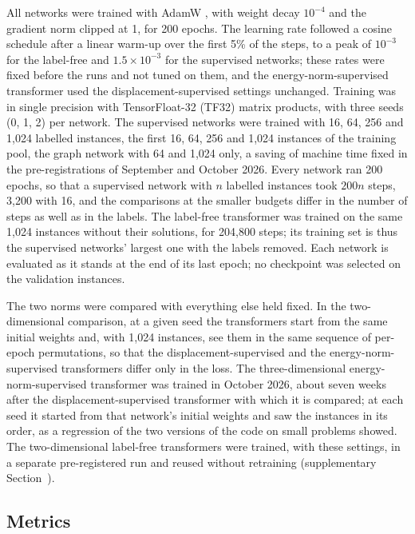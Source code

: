 All networks were trained with AdamW \cite{Loshchilov2019}, with weight decay $10^{-4}$ and
the gradient norm clipped at 1, for 200 epochs. The learning rate followed a cosine schedule
after a linear warm-up over the first 5\% of the steps, to a peak of $10^{-3}$ for the
label-free and $1.5\times10^{-3}$ for the supervised networks; these rates were fixed before
the runs and not tuned on them, and the energy-norm-supervised transformer used the
displacement-supervised settings unchanged. Training was in single precision with
TensorFloat-32 (TF32) matrix products, with three seeds (0, 1, 2) per network. The
supervised networks were trained with 16, 64, 256 and 1,024 labelled instances, the first
16, 64, 256 and 1,024 instances of the training pool, the graph network with 64 and 1,024
only, a saving of machine time fixed in the pre-registrations of September and October 2026.
Every network ran 200 epochs, so that a supervised network with $n$ labelled instances took
$200n$ steps, 3,200 with 16, and the comparisons at the smaller budgets differ in the number
of steps as well as in the labels. The label-free transformer was trained on the same 1,024
instances without their solutions, for 204,800 steps; its training set is thus the
supervised networks' largest one with the labels removed. Each network is evaluated as it
stands at the end of its last epoch; no checkpoint was selected on the validation instances.

The two norms were compared with everything else held fixed. In the two-dimensional
comparison, at a given seed the transformers start from the same initial weights and, with
1,024 instances, see them in the same sequence of per-epoch permutations, so that the
displacement-supervised and the energy-norm-supervised transformers differ only in the loss.
The three-dimensional energy-norm-supervised transformer was trained in October 2026, about
seven weeks after the displacement-supervised transformer with which it is compared; at each
seed it started from that network's initial weights and saw the instances in its order, as a
regression of the two versions of the code on small problems showed. The two-dimensional
label-free transformers were trained, with these settings, in a separate pre-registered run
and reused without retraining (supplementary Section~\SuppSide).

\subsection{Metrics}\label{sec:methods:metrics}

